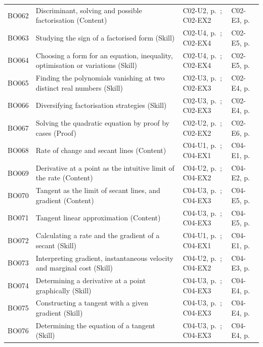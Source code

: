 \begin{longtable}{p{.1\linewidth}p{.43\linewidth}p{.19\linewidth}p{.16\linewidth}}
BO062 & Discriminant, solving and possible factorisation (Content) & C02-U2, p.\,\pageref{C02-U2} ; C02-EX2 & C02-E3, p.\,\pageref{C02-E3} \\
BO063 & Studying the sign of a factorised form (Skill) & C02-U4, p.\,\pageref{C02-U4} ; C02-EX4 & C02-E5, p.\,\pageref{C02-E5} \\
BO064 & Choosing a form for an equation, inequality, optimisation or variations (Skill) & C02-U4, p.\,\pageref{C02-U4} ; C02-EX4 & C02-E5, p.\,\pageref{C02-E5} \\
BO065 & Finding the polynomials vanishing at two distinct real numbers (Skill) & C02-U3, p.\,\pageref{C02-U3} ; C02-EX3 & C02-E4, p.\,\pageref{C02-E4} \\
BO066 & Diversifying factorisation strategies (Skill) & C02-U3, p.\,\pageref{C02-U3} ; C02-EX3 & C02-E4, p.\,\pageref{C02-E4} \\
BO067 & Solving the quadratic equation by proof by cases (Proof) & C02-U2, p.\,\pageref{C02-U2} ; C02-EX2 & C02-E6, p.\,\pageref{C02-E6} \\
BO068 & Rate of change and secant lines (Content) & C04-U1, p.\,\pageref{C04-U1} ; C04-EX1 & C04-E1, p.\,\pageref{C04-E1} \\
BO069 & Derivative at a point as the intuitive limit of the rate (Content) & C04-U2, p.\,\pageref{C04-U2} ; C04-EX2 & C04-E2, p.\,\pageref{C04-E2} \\
BO070 & Tangent as the limit of secant lines, and gradient (Content) & C04-U3, p.\,\pageref{C04-U3} ; C04-EX3 & C04-E5, p.\,\pageref{C04-E5} \\
BO071 & Tangent linear approximation (Content) & C04-U3, p.\,\pageref{C04-U3} ; C04-EX3 & C04-E5, p.\,\pageref{C04-E5} \\
BO072 & Calculating a rate and the gradient of a secant (Skill) & C04-U1, p.\,\pageref{C04-U1} ; C04-EX1 & C04-E1, p.\,\pageref{C04-E1} \\
BO073 & Interpreting gradient, instantaneous velocity and marginal cost (Skill) & C04-U2, p.\,\pageref{C04-U2} ; C04-EX2 & C04-E3, p.\,\pageref{C04-E3} \\
BO074 & Determining a derivative at a point graphically (Skill) & C04-U3, p.\,\pageref{C04-U3} ; C04-EX3 & C04-E4, p.\,\pageref{C04-E4} \\
BO075 & Constructing a tangent with a given gradient (Skill) & C04-U3, p.\,\pageref{C04-U3} ; C04-EX3 & C04-E4, p.\,\pageref{C04-E4} \\
BO076 & Determining the equation of a tangent (Skill) & C04-U3, p.\,\pageref{C04-U3} ; C04-EX3 & C04-E4, p.\,\pageref{C04-E4} \\

\end{longtable}
